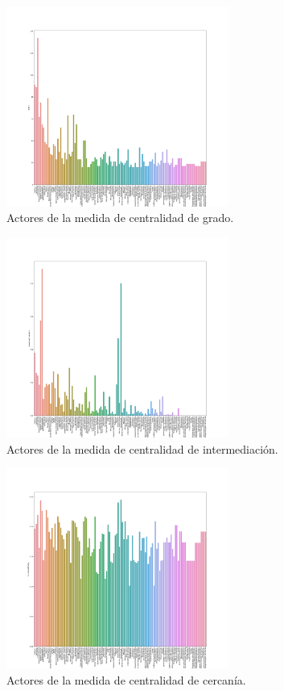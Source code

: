 \documentclass{uimppracticas}
\begin{document}
\begin{figure}[H]
	\centering
	\includegraphics[width=0.65\textwidth]{images/degree}
	\caption{Actores de la medida de centralidad de grado.}
	\label{degree}
\end{figure}

\begin{figure}[H]
	\centering
	\includegraphics[width=0.65\textwidth]{images/betweenesscentrality}
	\caption{Actores de la medida de centralidad de intermediación.}
	\label{betweenesscentrality}
\end{figure}

\begin{figure}[H]
	\centering
	\includegraphics[width=0.65\textwidth]{images/closnesscentrality}
	\caption{Actores de la medida de centralidad de cercanía.}
	\label{closnesscentrality}
\end{figure}
\end{document}
